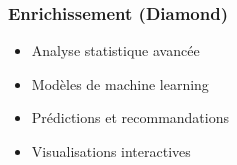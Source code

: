 \subsubsection{Enrichissement (Diamond)}
\begin{itemize}
    \item Analyse statistique avancée
    \item Modèles de machine learning
    \item Prédictions et recommandations
    \item Visualisations interactives
\end{itemize}
